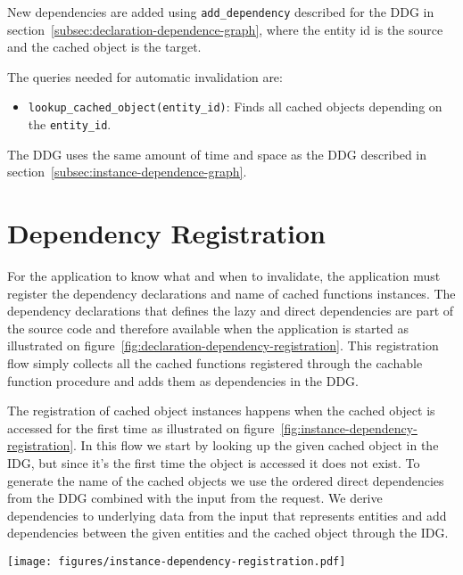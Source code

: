 New dependencies are added using \verb$add_dependency$ described for the DDG in section~\ref{subsec:declaration-dependence-graph}, where the entity id is the source and the cached object is the target.

The queries needed for automatic invalidation are:

\begin{itemize}
  \item \verb$lookup_cached_object(entity_id)$: Finds all cached objects depending on the \verb$entity_id$.
\end{itemize}

The DDG uses the same amount of time and space as the DDG described in section~\ref{subsec:instance-dependence-graph}.



\section{Dependency Registration}
\label{sec:dependency-registration}


For the application to know what and when to invalidate, the application must register the dependency declarations and name of cached functions instances. The dependency declarations that defines the lazy and direct dependencies are part of the source code and therefore available when the application is started as illustrated on figure~\ref{fig:declaration-dependency-registration}. This registration flow simply collects all the cached functions registered through the cachable function procedure and adds them as dependencies in the DDG.

The registration of cached object instances happens when the cached object is accessed for the first time as illustrated on figure~\ref{fig:instance-dependency-registration}. In this flow we start by looking up the given cached object in the IDG, but since it's the first time the object is accessed it does not exist. To generate the name of the cached objects we use the ordered direct dependencies from the DDG combined with the input from the request. We derive dependencies to underlying data from the input that represents entities and add dependencies between the given entities and the cached object through the IDG.

\begin{figure*}[ht!]
  \centering
  \texttt{[image: figures/instance-dependency-registration.pdf]}
  \caption{The flow in which cached object instances are accessed when they are accessed the first time}
  \label{fig:instance-dependency-registration}
\end{figure*}

